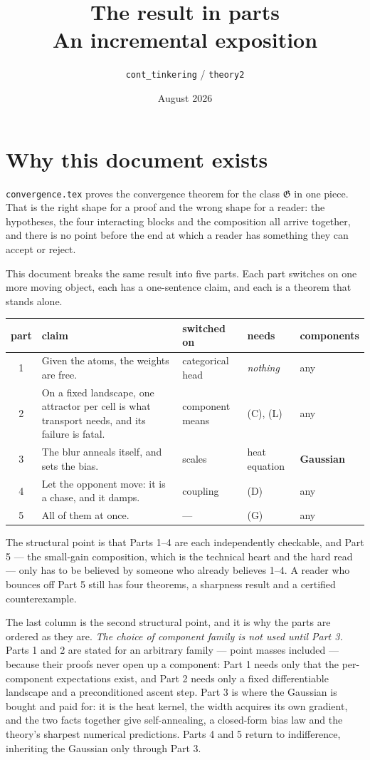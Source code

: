 \documentclass[11pt]{article}
\title{The result in parts\\
\large An incremental exposition}
\author{\texttt{cont\_tinkering} / \texttt{theory2}}
\date{August 2026}
\theoremstyle{definition}
\begin{document}
\maketitle

\section*{Why this document exists}

\texttt{convergence.tex} proves the convergence theorem for the class
$\mathfrak{G}$ in one piece. That is the right shape for a proof and the wrong
shape for a reader: the hypotheses, the four interacting blocks and the
composition all arrive together, and there is no point before the end at which a
reader has something they can accept or reject.

This document breaks the same result into five parts. Each part switches on one
more moving object, each has a one-sentence claim, and each is a theorem that
stands alone.

\begin{center}
\begin{tabular}{@{}c p{} p{} p{} p{}@{}}
\hline
part & claim & switched on & needs & components\\
\hline
1 & Given the atoms, the weights are free. & categorical head &
  \emph{nothing} & any\\
2 & On a fixed landscape, one attractor per cell is what transport needs, and
  its failure is fatal. & component means & (C), (L) & any\\
3 & The blur anneals itself, and sets the bias. & scales & heat equation &
  \textbf{Gaussian}\\
4 & Let the opponent move: it is a chase, and it damps. & coupling & (D) & any\\
5 & All of them at once. & --- & (G) & any\\
\hline
\end{tabular}
\end{center}

\noindent
The structural point is that Parts 1--4 are each independently checkable, and
Part 5 --- the small-gain composition, which is the technical heart and the hard
read --- only has to be believed by someone who already believes 1--4. A reader
who bounces off Part 5 still has four theorems, a sharpness result and a
certified counterexample.

The last column is the second structural point, and it is why the parts are
ordered as they are. \emph{The choice of component family is not used until
Part 3.} Parts 1 and 2 are stated for an arbitrary family --- point masses
included --- because their proofs never open up a component: Part 1 needs only
that the per-component expectations exist, and Part 2 needs only a fixed
differentiable landscape and a preconditioned ascent step. Part 3 is where the
Gaussian is bought and paid for: it is the heat kernel, the width acquires its own
gradient, and the two facts together give self-annealing, a closed-form bias law
and the theory's sharpest numerical predictions. Parts 4 and 5 return to
indifference, inheriting the Gaussian only through Part 3.
\end{document}
